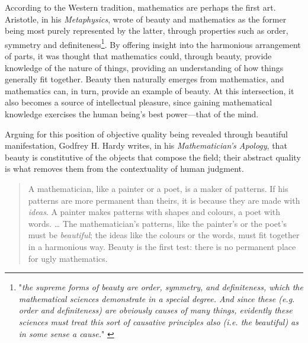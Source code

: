 According to the Western tradition, mathematics are perhaps the first art. Aristotle, in his \emph{Metaphysics}, wrote of beauty and mathematics as the former being most purely represented by the latter, through properties such as order, symmetry and definiteness\footnote{"\emph{the supreme forms of beauty are order, symmetry, and definiteness, which the mathematical sciences demonstrate in a special degree. And since these (e.g. order and definiteness) are obviously causes of many things, evidently these sciences must treat this sort of causative principles also (i.e. the beautiful) as in some sense a cause.}" \citep{aristotle_metaphysics_2006}}. By offering insight into the harmonious arrangement of parts, it was thought that mathematics could, through beauty, provide knowledge of the nature of things, providing an understanding of how things generally fit together. Beauty then naturally emerges from mathematics, and mathematics can, in turn, provide an example of beauty. At this intersection, it also becomes a source of intellectual pleasure, since gaining mathematical knowledge exercises the human being's best power—that of the mind.

Arguing for this position of objective quality being revealed through beautiful manifestation, Godfrey H. Hardy writes, in his \emph{Mathematician's Apology}, that beauty is constitutive of the objects that compose the field; their abstract quality is what removes them from the contextuality of human judgment.

\begin{quote}
    A mathematician, like a painter or a poet, is a maker of patterns. If his patterns are more permanent than theirs, it is because they are made with \emph{ideas}. A painter makes patterns with shapes and colours, a poet with words.
    \dots
    The mathematician's patterns, like the painter's or the poet's must be \emph{beautiful}; the ideas like the colours or the words, must fit together in a harmonious way. Beauty is the first test: there is no permanent place for ugly mathematics. \citep{hardy_mathematician_2012}
\end{quote}


